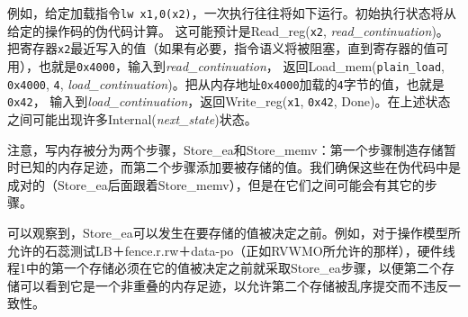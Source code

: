 \begin{commentary}
  例如，给定加载指令\verb!lw x1,0(x2)!，一次执行往往将如下运行。初始执行状态将从给定的操作码的伪代码计算。
  这可能预计是{\sc Read\_reg}({\tt x2}, {\it read\_continuation})。
  把寄存器{\tt x2}最近写入的值（如果有必要，指令语义将被阻塞，直到寄存器的值可用），也就是{\tt 0x4000}，输入到{\it read\_continuation}，
  返回{\sc Load\_mem}({\tt plain\_load}, {\tt 0x4000}, {\tt 4}, {\it load\_continuation})。把从内存地址{\tt 0x4000}加载的{\tt 4}字节的值，也就是{\tt 0x42}，
  输入到{\it load\_continuation}，返回{\sc Write\_reg}({\tt x1}, {\tt 0x42}, {\sc Done})。在上述状态之间可能出现许多{\sc Internal}({\it next\_state})状态。
\end{commentary}

注意，写内存被分为两个步骤，{\sc Store\_ea}和{\sc Store\_memv}：第一个步骤制造存储暂时已知的内存足迹，而第二个步骤添加要被存储的值。我们确保这些在伪代码中是成对的（{\sc Store\_ea}后面跟着{\sc Store\_memv}），但是在它们之间可能会有其它的步骤。
\begin{commentary}
  可以观察到，{\sc Store\_ea}可以发生在要存储的值被决定之前。例如，对于操作模型所允许的石蕊测试LB＋fence.r.rw＋data-po（正如RVWMO所允许的那样），硬件线程1中的第一个存储必须在它的值被决定之前就采取{\sc Store\_ea}步骤，以便第二个存储可以看到它是一个非重叠的内存足迹，以允许第二个存储被乱序提交而不违反一致性。
\end{commentary}

